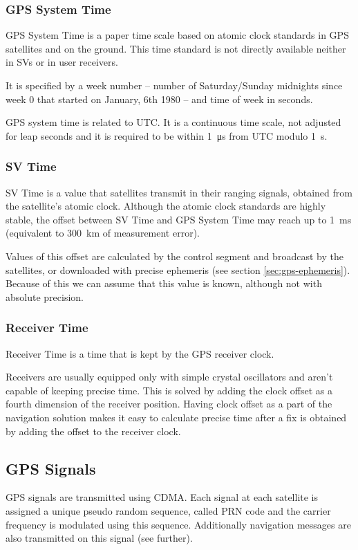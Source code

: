 \subsubsection{GPS System Time}

GPS System Time is a paper time scale based on atomic clock standards in GPS
satellites and on the ground.
This time standard is not directly available neither in SVs or in user receivers.

It is specified by a week number -- number of Saturday/Sunday midnights since week 0
that started on January, 6th 1980 -- and time of week in seconds.

GPS system time is related to UTC.
It is a continuous time scale, not adjusted for leap seconds
and it is required to be within \SI{1}{\micro\second} from UTC modulo \SI{1}{\second}.

\subsubsection{SV Time}
SV Time is a value that satellites transmit in their ranging signals,
obtained from the satellite's atomic clock.
Although the atomic clock standards are highly stable, the offset between SV
Time and GPS System Time may reach up to \SI{1}{\milli\second} (equivalent to
\SI{300}{\kilo\meter} of measurement error).

Values of this offset are calculated by the control segment
and broadcast by the satellites, or downloaded with precise ephemeris
(see section \ref{sec:gps-ephemeris}).
Because of this we can assume that this value is known, although not
with absolute precision.

\subsubsection{Receiver Time}
Receiver Time is a time that is kept by the GPS receiver clock.

Receivers are usually equipped only with simple crystal oscillators
and aren't capable of keeping precise time.
This is solved by adding the clock offset as a fourth dimension of the receiver position.
Having clock offset as a part of the navigation solution makes it easy to calculate
precise time after a fix is obtained by adding the offset to the receiver clock.

\subsection{GPS Signals}
GPS signals are transmitted using CDMA.
Each signal at each satellite is assigned a unique pseudo random sequence, called PRN code and the carrier frequency is
modulated using this sequence.
Additionally navigation messages are also transmitted on this signal (see further).

